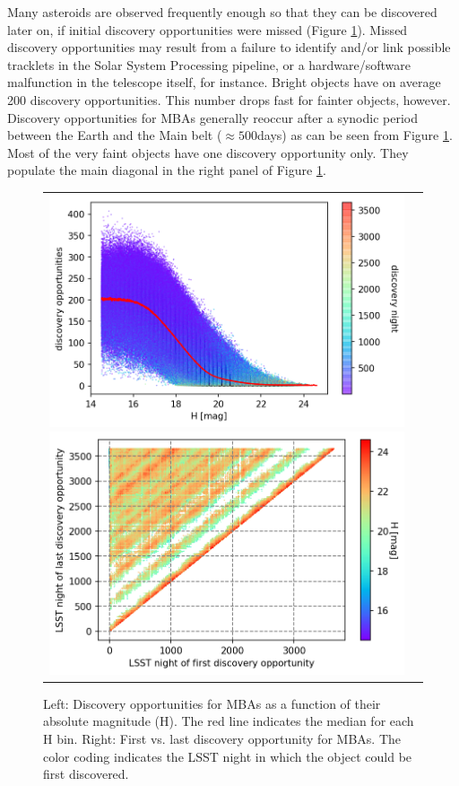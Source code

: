 %
Many asteroids are observed frequently enough so that they can be discovered later on, if initial discovery opportunities were missed (Figure \ref{fig:do}). Missed discovery opportunities may result from a failure to identify and/or link possible tracklets in the Solar System Processing \gls{pipeline}, or a hardware/software malfunction in the telescope itself, for instance. Bright objects have on average 200 discovery opportunities. This number drops fast for fainter objects, however. Discovery opportunities for MBAs generally reoccur after a synodic period between the Earth and the Main belt ($\approx 500$days) as can be seen from Figure \ref{fig:do}. Most of the very faint objects have one discovery opportunity only. They populate the main diagonal in the right panel of Figure \ref{fig:do}. 
%
\begin{figure}[tb!]
\begin{tabular}{ll}
\includegraphics[width=0.5\linewidth]{figs/disc_opport3.png}
\includegraphics[width=0.5\linewidth]{figs/first_vs_last.png} &
\end{tabular}
\caption{Left: Discovery opportunities for MBAs as a function of their absolute magnitude (H). The red line indicates the median for each H bin. Right: First vs. last discovery opportunity for MBAs. The color coding indicates the \gls{LSST} night in which the object could be first discovered.}
\label{fig:do}       %
\end{figure}
\clearpage

